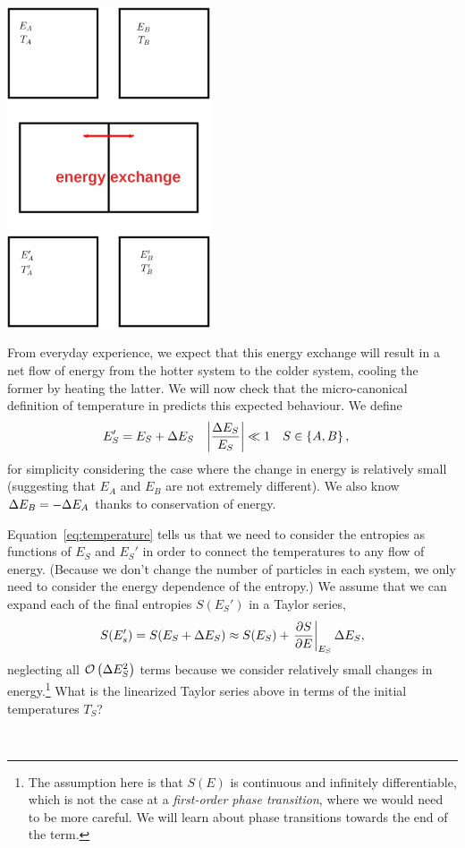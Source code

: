 \begin{center}
  \includegraphics[width=0.45\textwidth]{figs/unit02_heat-exchange.pdf}
\end{center}

From everyday experience, we expect that this energy exchange will result in a net flow of energy from the hotter system to the colder system, cooling the former by heating the latter.
We will now check that the micro-canonical definition of temperature in  predicts this expected behaviour.
We define
\begin{align*}
  E_S' & = E_S + \Delta E_S &
  \left|\frac{\Delta E_S}{E_S}\right| & \ll 1 &
  S & \in \left\{A, B\right\},
\end{align*}
for simplicity considering the case where the change in energy is relatively small (suggesting that $E_A$ and $E_B$ are not extremely different).
We also know $\Delta E_B = -\Delta E_A$ thanks to conservation of energy.

Equation~\ref{eq:temperature} tells us that we need to consider the entropies as functions of $E_S$ and $E_S'$ in order to connect the temperatures to any flow of energy.
(Because we don't change the number of particles in each system, we only need to consider the energy dependence of the entropy.)
We assume that we can expand each of the final entropies $S(E_S')$ in a Taylor series,
\begin{equation*}
  S(E_s') = S(E_S + \Delta E_S) \approx S(E_S) + \left.\frac{\partial S}{\partial E}\right|_{E_S} \Delta E_S,
\end{equation*}
neglecting all $\mathcal O\left(\Delta E_S^2\right)$ terms because we consider relatively small changes in energy.\footnote{The assumption here is that $S(E)$ is continuous and infinitely differentiable, which is not the case at a \textit{first-order phase transition}, where we would need to be more careful.  We will learn about phase transitions towards the end of the term.}
What is the linearized Taylor series above in terms of the initial temperatures $T_S$?
\begin{mdframed}
  \ \\[50 pt]
\end{mdframed}

